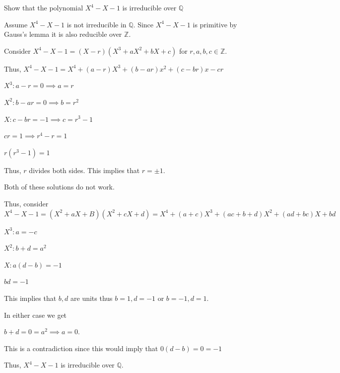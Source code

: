 \documentclass[12pt, letterpaper]{article}
\newcommand{\Q}{\mathbb{Q}}
\newcommand{\Z}{\mathbb{Z}}
\begin{document}
\qh
\begin{subproblem}{}
    Show that the polynomial $X^4 - X - 1$ is irreducible over $\Q$
\end{subproblem}
\begin{problemproof}
    Assume $X^4-X-1$ is not irreducible in $\Q$. Since $X^4-X-1$ is primitive by Gauss's lemma it is also reducible over $\Z$.
    
    Consider $X^4-X-1=(X-r)(X^3+aX^2+bX+c)$ for $r,a,b,c \in \Z$.

    Thus, $X^4-X-1=X^4+(a-r)X^3+(b-ar)x^2+(c-br)x-cr$

    $X^3: a-r=0 \implies a=r$

    $X^2: b-ar=0 \implies b=r^2$

    $X: c-br=-1 \implies c=r^3-1$

    $cr=1 \implies r^4-r=1$

    $r(r^3-1)=1$

    Thus, $r$ divides both sides. This implies that $r=\pm 1$.

    Both of these solutions do not work.

    Thus, consider $X^4-X-1=(X^2+aX+B)(X^2+cX+d)=X^4+(a+c)X^3+(ac+b+d)X^2+(ad+bc)X+bd$

    $X^3: a=-c$

    $X^2: b+d=a^2$

    $X: a(d-b)=-1$

    $bd=-1$

    This implies that $b,d$ are units thus $b=1,d=-1$ or $b=-1,d=1$.

    In either case we get

    $b+d=0=a^2 \implies a=0$.

    This is a contradiction since this would imply that $0(d-b)=0=-1$

    Thus, $X^4-X-1$ is irreducible over $\Q$.
\end{problemproof}
\end{document}
